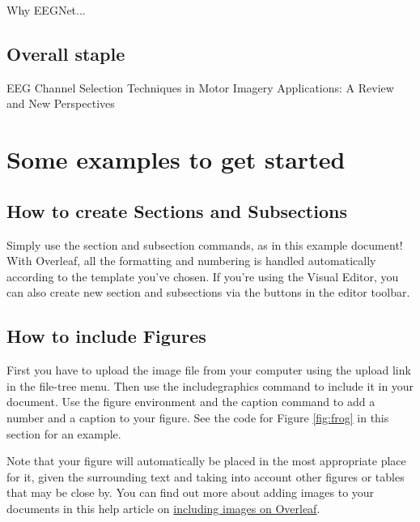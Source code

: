 \documentclass{article}
\begin{document}
Why EEGNet...

\subsection{Overall staple}
{EEG Channel Selection Techniques in Motor Imagery Applications: A Review and New Perspectives}























\section{Some examples to get started}

\subsection{How to create Sections and Subsections}

Simply use the section and subsection commands, as in this example document! With Overleaf, all the formatting and numbering is handled automatically according to the template you've chosen. If you're using the Visual Editor, you can also create new section and subsections via the buttons in the editor toolbar.

\subsection{How to include Figures}

First you have to upload the image file from your computer using the upload link in the file-tree menu. Then use the includegraphics command to include it in your document. Use the figure environment and the caption command to add a number and a caption to your figure. See the code for Figure \ref{fig:frog} in this section for an example.

Note that your figure will automatically be placed in the most appropriate place for it, given the surrounding text and taking into account other figures or tables that may be close by. You can find out more about adding images to your documents in this help article on \href{https://www.overleaf.com/learn/how-to/Including_images_on_Overleaf}{including images on Overleaf}.
\end{document}
